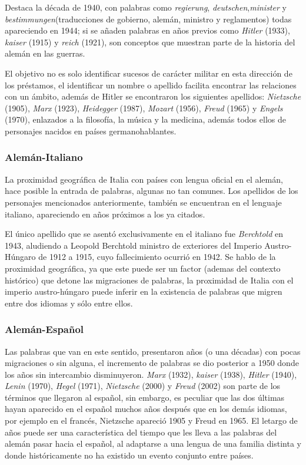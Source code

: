 Destaca la década de 1940, con palabras como \textit{regierung},  \textit{deutschen},\textit{minister} y  \textit{bestimmungen}(traducciones de gobierno, alemán, ministro y reglamentos) todas apareciendo en 1944;  si se añaden palabras en años previos como \textit{Hitler} (1933), \textit{kaiser} (1915) y \textit{reich} (1921), son conceptos que muestran parte de la historia del alemán en las guerras. 

El objetivo no es solo identificar sucesos de carácter militar en esta dirección de los préstamos, el identificar un nombre o apellido facilita encontrar las relaciones con un ámbito,  además de Hitler se encontraron los siguientes apellidos:  \textit{Nietzsche} (1905),  \textit{Marx} (1923), \textit{Heidegger} (1987),  \textit{Mozart} (1956), \textit{Freud} (1965) y \textit{Engels} (1970), enlazados a la filosofía, la música y la medicina,  además todos ellos de personajes nacidos en países germanohablantes.


\subsubsection*{Alemán-Italiano}%

La proximidad geográfica de Italia con países con lengua oficial en el alemán, hace posible la entrada de palabras, algunas no tan comunes.  Los apellidos de los personajes mencionados anteriormente, también se encuentran en el lenguaje italiano, apareciendo en años próximos a los ya citados.  

El único apellido que se asentó exclusivamente en el  italiano fue \textit{Berchtold} en 1943, aludiendo a Leopold Berchtold ministro de exteriores del Imperio Austro-Húngaro de 1912 a 1915, cuyo fallecimiento ocurrió en 1942.  Se hablo de la proximidad geográfica, ya que este puede ser un factor (ademas del contexto histórico) que detone las migraciones de palabras, la proximidad de Italia con el imperio austro-húngaro puede inferir en la existencia de  palabras que migren entre  dos idiomas y sólo entre ellos. 

  
\subsubsection*{Alemán-Español}%

Las palabras que van en este sentido,  presentaron años (o una décadas)  con pocas migraciones o sin alguna, el incremento de palabras se dio posterior a 1950 donde los años sin intercambio disminuyeron.  \textit{Marx} (1932), \textit{kaiser} (1938), \textit{Hitler} (1940), \textit{Lenin} (1970), \textit{Hegel} (1971),  \textit{Nietzsche} (2000) y \textit{Freud} (2002) son parte de los términos que llegaron al español,  sin embargo, es peculiar que las dos últimas hayan aparecido en el español muchos años después que en los demás idiomas, por ejemplo en el francés,  Nietzsche apareció 1905 y Freud en 1965. El letargo de años puede ser una característica del tiempo que les lleva  a las  palabras del alemán pasar hacia el español, al adaptarse a una lengua de una familia distinta y donde históricamente no ha existido un evento conjunto entre países. 



